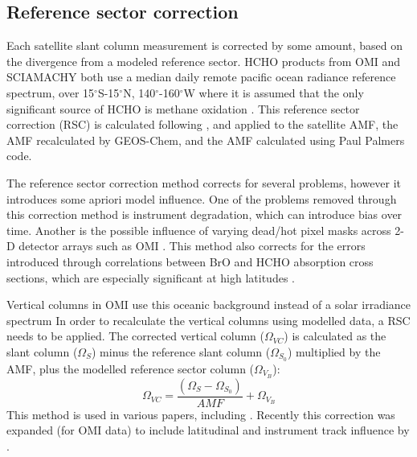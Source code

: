   \subsection{Reference sector correction}
    \label{Model:omiRecalc:RSC}
    Each satellite slant column measurement is corrected by some amount, based on the divergence from a modeled reference sector.
    HCHO products from OMI and SCIAMACHY both use a median daily remote pacific ocean radiance reference spectrum, over 15$^{\circ}$S-15$^{\circ}$N, 140$^{\circ}$-160$^{\circ}$W where it is assumed that the only significant source of HCHO is methane oxidation \parencite{DeSmedt2008,Barkley2013,Kurosu2014}.
    This reference sector correction (RSC) is calculated following \textcite{Abad2016}, and applied to the satellite AMF, the AMF recalculated by GEOS-Chem, and the AMF calculated using Paul Palmers code.
    
    The reference sector correction method corrects for several problems, however it introduces some apriori model influence.
    One of the problems removed through this correction method is instrument degradation, which can introduce bias over time.
    Another is the possible influence of varying dead/hot pixel masks across 2-D detector arrays such as OMI \parencite{DeSmedt2015}.
    This method also corrects for the errors introduced through correlations between BrO and HCHO absorption cross sections, which are especially significant at high latitudes \parencite{Abad2015}.
    
    Vertical columns in OMI use this oceanic background instead of a solar irradiance spectrum
    In order to recalculate the vertical columns using modelled data, a RSC needs to be applied.
    The corrected vertical column ($\Omega_{VC}$) is calculated as the slant column ($\Omega_S$) minus the reference slant column ($\Omega_{S_0}$) multiplied by the AMF, plus the modelled reference sector column ($\Omega_{V_B}$):
    \begin{equation*}
      \Omega_{VC} = \frac{ \left( \Omega_S - \Omega_{S_0} \right) }{ AMF } + \Omega_{V_B}
    \end{equation*}
    This method is used in various papers, including \textcite{DeSmedt2008, DeSmedt2012, DeSmedt2015, Barkley2013, Bauwens2016}.
    Recently this correction was expanded (for OMI data) to include latitudinal and instrument track influence by \textcite{Abad2015}.
    
